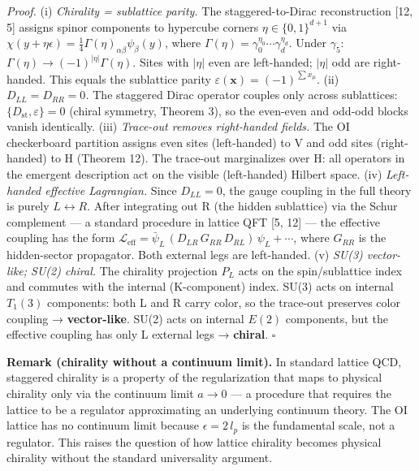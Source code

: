 \documentclass[
  11pt,
]{article}
\begin{document}
\emph{Proof.} (i) \emph{Chirality = sublattice parity.} The
staggered-to-Dirac reconstruction {[}12, 5{]} assigns spinor components
to hypercube corners \(\eta \in \{0,1\}^{d+1}\) via
\(\chi(y + \eta\epsilon) = \frac{1}{4}\Gamma(\eta)_{\alpha\beta}\psi_\beta(y)\),
where \(\Gamma(\eta) = \gamma_0^{\eta_0}\cdots\gamma_d^{\eta_d}\). Under
\(\gamma_5\): \(\Gamma(\eta) \to (-1)^{|\eta|}\Gamma(\eta)\). Sites with
\(|\eta|\) even are left-handed; \(|\eta|\) odd are right-handed. This
equals the sublattice parity
\(\varepsilon(\mathbf{x}) = (-1)^{\sum x_\mu}\). (ii)
\emph{\(D_{LL} = D_{RR} = 0\).} The staggered Dirac operator couples
only across sublattices: \(\{D_{\text{st}}, \varepsilon\} = 0\) (chiral
symmetry, Theorem 3), so the even-even and odd-odd blocks vanish
identically. (iii) \emph{Trace-out removes right-handed fields.} The OI
checkerboard partition assigns even sites (left-handed) to V and odd
sites (right-handed) to H (Theorem 12). The trace-out marginalizes over
H: all operators in the emergent description act on the visible
(left-handed) Hilbert space. (iv) \emph{Left-handed effective
Lagrangian.} Since \(D_{LL} = 0\), the gauge coupling in the full theory
is purely \(L \leftrightarrow R\). After integrating out R (the hidden
sublattice) via the Schur complement --- a standard procedure in lattice
QFT {[}5, 12{]} --- the effective coupling has the form
\(\mathcal{L}_{\text{eff}} = \bar{\psi}_L\,(D_{LR}\,G_{RR}\,D_{RL})\,\psi_L + \cdots\),
where \(G_{RR}\) is the hidden-sector propagator. Both external legs are
left-handed. (v) \emph{SU(3) vector-like; SU(2) chiral.} The chirality
projection \(P_L\) acts on the spin/sublattice index and commutes with
the internal (K-component) index. SU(3) acts on internal \(T_1(3)\)
components: both L and R carry color, so the trace-out preserves color
coupling → \textbf{vector-like}. SU(2) acts on internal \(E(2)\)
components, but the effective coupling has only L external legs →
\textbf{chiral}. \(\square\)

\textbf{Remark (chirality without a continuum limit).} In standard
lattice QCD, staggered chirality is a property of the regularization
that maps to physical chirality only via the continuum limit \(a \to 0\)
--- a procedure that requires the lattice to be a regulator
approximating an underlying continuum theory. The OI lattice has no
continuum limit because \(\epsilon = 2\,l_p\) is the fundamental scale,
not a regulator. This raises the question of how lattice chirality
becomes physical chirality without the standard universality argument.
\end{document}
